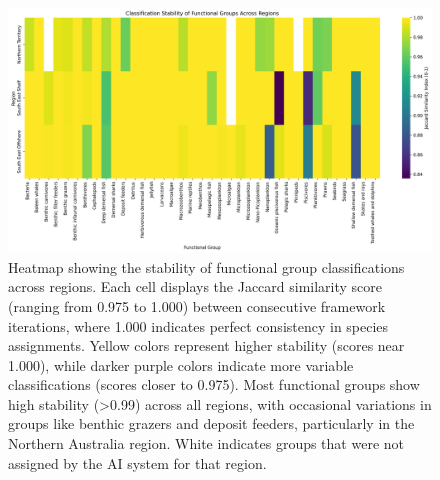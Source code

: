 \begin{figure}[htbp]
    \centering
    \includegraphics[width=\textwidth]{figures/group_stability_heatmap.png}
    \caption{Heatmap showing the stability of functional group classifications across regions. Each cell displays the Jaccard similarity score (ranging from 0.975 to 1.000) between consecutive framework iterations, where 1.000 indicates perfect consistency in species assignments. Yellow colors represent higher stability (scores near 1.000), while darker purple colors indicate more variable classifications (scores closer to 0.975). Most functional groups show high stability (>0.99) across all regions, with occasional variations in groups like benthic grazers and deposit feeders, particularly in the Northern Australia region. White indicates groups that were not assigned by the AI system for that region.}
    \label{fig:stability_heatmap_supp}
\end{figure}

